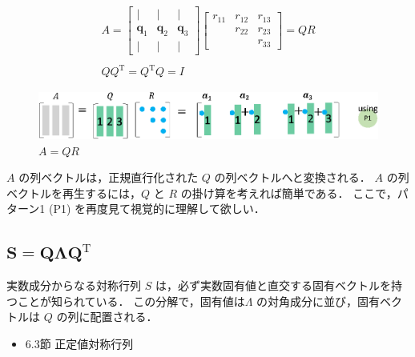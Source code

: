 \documentclass[letterpaper]{article}
\DeclareRobustCommand\transp{^{\mathrm{T}}}
\begin{document}
\begin{gather*}
  A = 
  \begin{bmatrix}
    | & | & |\\
    \bm{q}_1 & \bm{q}_2 & \bm{q}_3\\
    | & | & |
  \end{bmatrix}
  \begin{bmatrix}
    r_{11} & r_{12} & r_{13}\\
           & r_{22} & r_{23}\\
           &        & r_{33}
  \end{bmatrix} = QR\\
  \\
  Q Q\transp=Q\transp Q = I
\end{gather*}

\begin{figure}[H]
  \includegraphics[keepaspectratio, width=\linewidth]{QR.eps}
  \caption{$A=QR$}
\end{figure}


$A$ の列ベクトルは，正規直行化された $Q$ の列ベクトルへと変換される．
$A$ の列ベクトルを再生するには，$Q$ と $R$ の掛け算を考えれば簡単である．
ここで，パターン1 (P1) を再度見て視覚的に理解して欲しい．


\clearpage

\subsection{$\boldsymbol{S=Q \Lambda Q\transp}$}

実数成分からなる対称行列 $S$ は，必ず実数固有値と直交する固有ベクトルを持つことが知られている．
この分解で，固有値は$\Lambda$ の対角成分に並び，固有ベクトルは $Q$ の列に配置される．

\begin{itemize}
  \item 6.3節 正定値対称行列
\end{itemize}
\end{document}
